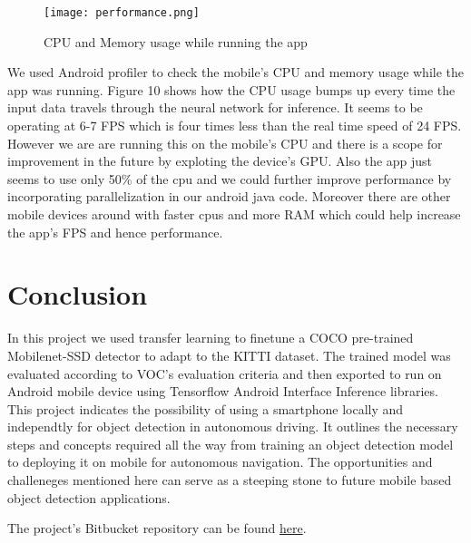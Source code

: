 \documentclass{article}
\begin{document}
\begin{figure}[H]
	\centering
	\texttt{[image: performance.png]}
	\caption{CPU and Memory usage while running the app}
\end{figure}

We used Android profiler to check the mobile's CPU and memory usage while the app was running. Figure 10 shows how the CPU usage bumps up every time the input data travels through the neural network for inference. It seems to be operating at 6-7 FPS which is four times less than the real time speed of 24 FPS. However we are are running this on the mobile's CPU and there is a scope for improvement in the future by exploting the device's GPU. Also the app just seems to use only 50\% of the cpu and we could further improve performance by incorporating parallelization in our android java code.  Moreover there are other mobile devices around with faster cpus and more RAM which could help increase the app's FPS and hence performance. 

\section{Conclusion}

In this project we used transfer learning to finetune a COCO pre-trained Mobilenet-SSD detector to adapt to the KITTI dataset. The trained model was evaluated according to VOC's evaluation criteria and then exported to run on Android mobile device using Tensorflow Android Interface Inference libraries. This project indicates the possibility of using a smartphone locally and independtly for object detection in autonomous driving. It outlines the necessary steps and concepts required all the way from training an object detection model to deploying it on mobile for autonomous navigation. The opportunities and challeneges mentioned here can serve as a steeping stone to future mobile based object detection applications. 


The project's Bitbucket repository can be found \href{https://bitbucket.org/rajatsc/cse576-final-project/src/master/}{here}.

\medskip



\end{document}
